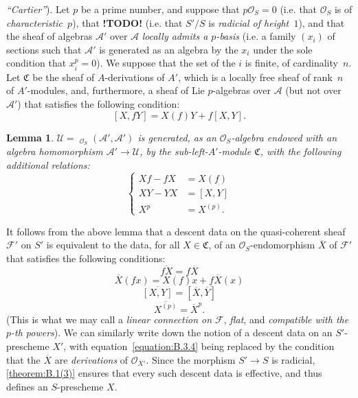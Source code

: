 \documentclass{article}
\theoremstyle{plain}
\newtheorem*{lemma*}{Lemma}
\theoremstyle{definition}
\newenvironment{example}[1]
  {\renewcommand\theinnercustomexample{#1}\innercustomexample}
  {\endinnercustomexample}
\newcommand{\sh}[1]{{\mathscr{#1}}}
\newcommand{\fk}[1]{{\mathfrak{#1}}}
\DeclareMathOperator{\Hom}{Hom}
\DeclareMathOperator{\shHom}{\underline{\Hom}}
\newcommand{\todo}{\textbf{ !TODO! }}
\newcommand{\oldpage}[1]{\marginpar{\footnotesize$\Big\vert$ \textit{p.~#1}}}
\begin{document}
\begin{example}{2}
  (\emph{``Cartier''}).
  Let $p$ be a prime number, and suppose that $p\sh{O}_S=0$ (i.e. that $\sh{O}_S$ is of \emph{characteristic~$p$}), that \todo (i.e. that $S'/S$ is \emph{radicial of height~$1$}), and that the sheaf of algebras $\sh{A}'$ over $\sh{A}$ \emph{locally admits a $p$-basis} (i.e. a family $(x_i)$ of sections such that $\sh{A}'$ is generated as an algebra by the $x_i$ under the sole condition that $x_i^p=0$).
  We suppose that the set of the $i$ is finite, of cardinality~$n$.
  Let $\fk{C}$ be the sheaf of $A$-derivations of $A'$, which is a locally free sheaf of rank~$n$ of $A'$-modules, and, furthermore, a sheaf of Lie $p$-algebras over $\sh{A}$ (but not over $\sh{A}'$) that satisfies the following condition:
  \[
  \label{equation:B.3.5}
    [X,fY] = X(f)Y + f[X,Y].
  \tag{3.5}
  \]
\end{example}

\begin{lemma*}
  $\sh{U}=\shHom_{\sh{O}_S}(\sh{A}',\sh{A}')$ is generated, as an $\sh{O}_S$-algebra endowed with an algebra homomorphism $\sh{A}'\to\sh{U}$, by the sub-left-$A'$-module $\fk{C}$, with the following additional relations:
  \[
  \label{equation:B.3.6}
    \begin{cases}
      Xf-fX &= X(f)
    \\XY-YX &= [X,Y]
    \\X^p &= X^{(p)}.
    \end{cases}
  \tag{3.6}
  \]
\end{lemma*}

It follows from the above lemma that a descent data on the quasi-coherent sheaf $\sh{F}'$ on $S'$ is equivalent to the data, for all $X\in\fk{C}$, of an $\sh{O}_S$-endomorphism $\overline{X}$ of $\sh{F}'$ that satisfies the following conditions:
\[
\label{equation:B.3.7}
  \overline{fX} = f\overline{X}
\tag{3.7}
\]
\[
\label{equation:B.3.8}
  \overline{X}(fx) = X(f)x + f\overline{X}(x)
\tag{3.8}
\]
\[
\label{equation:B.3.9}
  \overline{[X,Y]} = [\overline{X},\overline{Y}]
\tag{3.9}
\]
\[
\label{equation:B.3.10}
  \overline{X^{(p)}} = \overline{X}^p.
\tag{3.10}
\]
(This is what we may call a \emph{linear connection on $\sh{F}$}, \emph{flat}, and \emph{compatible with the $p$-th powers}).
We can similarly write down the notion of a descent data on an $S'$-prescheme $X'$, with equation~\cref{equation:B.3.4} being replaced by the condition that the $\overline{X}$ are \emph{derivations} of $\sh{O}_{X'}$.
Since the morphism $S'\to S$ is radicial, \cref{theorem:B.1(3)} ensures that every such descent data is
\oldpage{190-24}
effective, and thus defines an $S$-prescheme $X$.
\end{document}
